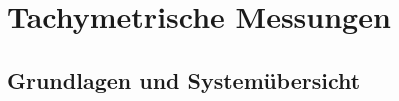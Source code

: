 \documentclass[12pt]{article}
\begin{document}
	\pagestyle{main}
\tableofcontents
\newpage
\section{Tachymetrische Messungen}	
\subsection{Grundlagen und Systemübersicht}
\end{document}
